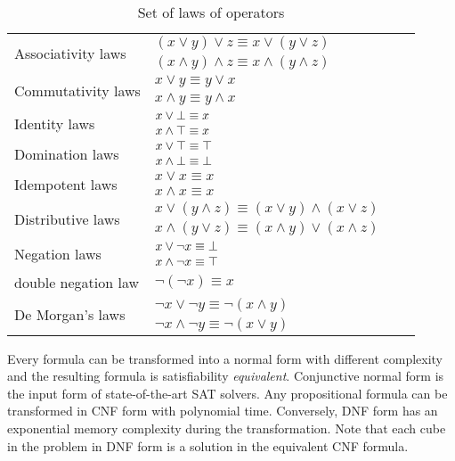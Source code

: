 \begin{table}[!htbp]
 \centering
 \begin{tabular}{lllc}
  \multirow{2}{*}{Associativity laws} & $(x \lor y) \lor z \equiv x \lor (y \lor z)$\\
          & $(x \land y) \land z \equiv x \land (y \land z)$\\
  \hline              
  \multirow{2}{*}{Commutativity laws} & $x \lor y \equiv y \lor x$\\
          & $x \land y \equiv y \land x$\\
  \hline      
  \multirow{2}{*}{Identity laws} & $x \lor \bot \equiv x$\\
           & $x \land \top \equiv x$\\
  \hline        
  \multirow{2}{*}{Domination laws} & $x \lor \top \equiv \top$\\
           &  $x \land \bot \equiv \bot$\\
  \hline        
  \multirow{2}{*}{Idempotent laws} & $x \lor x \equiv x$\\
               & $x \land x \equiv x$\\     
  \hline        
  \multirow{2}{*}{Distributive laws} & $x \lor (y \land z) \equiv (x \lor y) \land (x \lor z)$\\
           & $x \land (y \lor z) \equiv (x \land y) \lor (x \land z)$\\
 \hline        
 \multirow{2}{*}{Negation laws}  & $x \lor \neg x \equiv \bot$\\
        & $x \land \neg x \equiv \top$\\
  \hline
   double negation law & $\neg (\neg x) \equiv x$ \\
  \hline
  \multirow{2}{*}{De Morgan’s laws} & $\neg x \lor \neg y \equiv \neg (x \land y)$\\
            &  $\neg x \land \neg y \equiv \neg (x \lor y)$\\
 \end{tabular}
 \caption{Set of laws of operators}
 \label{tab:laws}
\end{table}
Every formula can be transformed into a normal form with different complexity and the resulting formula is 
satisfiability \emph{equivalent}.
Conjunctive normal form is the input form of state-of-the-art SAT solvers. Any propositional
formula can be transformed in CNF form with polynomial time\cite{Russell1994ArtiCI}. Conversely, DNF form has
an exponential memory complexity during the transformation\cite{darwiche2002knowledge}.
Note that each cube in the problem in DNF form is a solution in the equivalent CNF formula.
